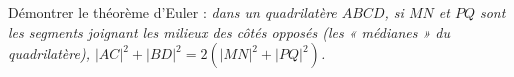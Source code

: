 Démontrer le théorème d'Euler : \emph{dans un quadrilatère $ABCD$, si $MN$ et $PQ$ sont les segments joignant les milieux des côtés opposés (les « médianes » du quadrilatère), $|AC|^2 + |BD|^2 = 2\left(|MN|^2 + |PQ|^2\right)$.}
